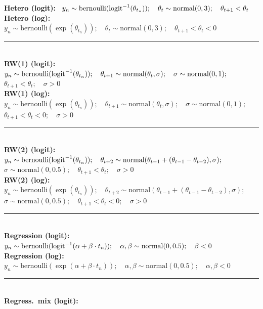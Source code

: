 \documentclass[plainboxedsections]{sciposter}
\begin{document}
\begin{multicols}{2}
{\bfseries Hetero (logit):} \
$y_n \sim \textrm{bernoulli}(\textrm{logit}^{-1}(\theta_{t_n}));
\quad \theta_t \sim 
\textrm{normal}(0, 3);
\quad \theta_{t+1} < \theta_t$
\\[12pt]
{\bfseries Hetero (log):} \
$y_n \sim \textrm{bernoulli}(\exp(\theta_{t_n}));
\quad \theta_t \sim \textrm{normal}(0, 3);
\quad \theta_{t+1} < \theta_t < 0$
%
\\ \hrule \mbox{}\\[6pt]
%
{\bfseries RW(1) (logit):} \
$y_n \sim \textrm{bernoulli}(\textrm{logit}^{-1}(\theta_{t_n}));
\quad \theta_{t+1} \sim \textrm{normal}(\theta_t, \sigma);
\quad \sigma \sim \textrm{normal}(0, 1);$
\\[2pt]
\null\qquad\qquad\qquad\qquad $\theta_{t+1} < \theta_t; 
\quad \sigma > 0$
\\[12pt]
{\bfseries RW(1) (log):} \
$y_n \sim \textrm{bernoulli}(\exp(\theta_{t_n}));
\quad \theta_{t+1} \sim \textrm{normal}(\theta_t, \sigma);
\quad \sigma \sim \textrm{normal}(0, 1);$
\\[2pt]
\null\qquad\qquad\qquad\qquad $\theta_{t+1} < \theta_t < 0;
\quad \sigma > 0$
%
\\ \hrule \mbox{}\\[6pt]
%
{\bfseries RW(2) (logit):} \
$y_n \sim \textrm{bernoulli}(\textrm{logit}^{-1}(\theta_{t_n})); 
\quad \theta_{t+2} \sim \textrm{normal}(\theta_{t-1} + (\theta_{t-1} - \theta_{t-2}), \sigma);$
\\[2pt]
\null\qquad\qquad\qquad\qquad $\sigma \sim \textrm{normal}(0, 0.5); 
\quad \theta_{t+1} < \theta_t; 
\quad \sigma > 0$
\\[12pt]
{\bfseries RW(2) (log):} \
$y_n \sim \textrm{bernoulli}(\exp(\theta_{t_n})); 
\quad \theta_{t+2} \sim \textrm{normal}(\theta_{t-1} + (\theta_{t-1} - \theta_{t-2}), \sigma);$
\\[2pt]
\null\qquad\qquad\qquad\qquad $\sigma \sim \textrm{normal}(0, 0.5); 
\quad \theta_{t+1} < \theta_t < 0; 
\quad \sigma > 0$
%
\\ \hrule \mbox{}\\[6pt]
%
{\bfseries Regression (logit):} \
$y_n \sim \textrm{bernoulli}(\textrm{logit}^{-1}(\alpha + \beta \cdot t_n));
\quad \alpha, \beta \sim \textrm{normal}(0, 0.5);
\quad \beta < 0$
\\[12pt]
{\bfseries Regression (log):} \
$y_n \sim \textrm{bernoulli}(\exp(\alpha + \beta \cdot t_n));
\quad \alpha, \beta \sim \textrm{normal}(0, 0.5); \quad \alpha, \beta < 0$
%
\\ \hrule \mbox{}\\[6pt]
%
{\bfseries Regress.\ mix (logit):}

\end{multicols}
\end{document}
